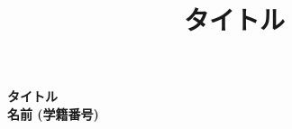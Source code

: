 \documentclass[10pt, a4j, twocolumn]{jsarticle}
\title{タイトル}
\begin{document}
\noindent
\begin{minipage}{\linewidth}
    {\LARGE \textbf{タイトル}} \\[2mm]
    {\large \textbf{名前 (学籍番号)}} \\[1mm]
\end{minipage}
\end{document}
